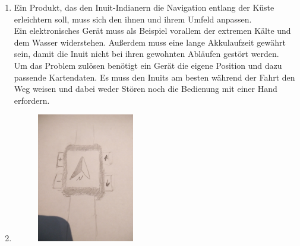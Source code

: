 \documentclass[a4paper,10pt]{article}
\begin{document}
\kopf

\renewcommand{\figurename}{Figure}

\begin{enumerate}

\item Ein Produkt, das den Inuit-Indianern die Navigation entlang der Küste erleichtern soll, muss sich den ihnen und ihrem Umfeld anpassen.\\
Ein elektronisches Gerät muss als Beispiel vorallem der extremen Kälte und dem Wasser widerstehen. Außerdem muss eine lange Akkulaufzeit gewährt sein, damit die Inuit nicht bei ihren gewohnten Abläufen gestört werden.\\
Um das Problem zulösen benötigt ein Gerät die eigene Position und dazu passende Kartendaten. Es muss den Inuits am besten während der Fahrt den Weg weisen und dabei weder Stören noch die Bedienung mit einer Hand erfordern.
\item
\begin{figure}[ht]
\centering \includegraphics[width=0.4\textwidth]{images/uhr.jpg}
\label{fig:wwu_logo}
\end{figure}


\end{enumerate}
\end{document}
